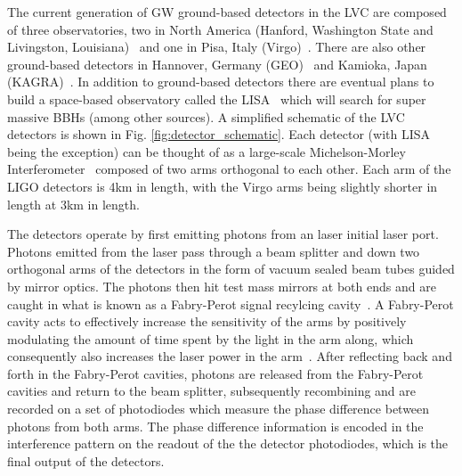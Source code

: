 The current generation of \ac{GW} ground-based detectors in 
the \ac{LVC} are composed of 
three observatories, two in North America 
(Hanford, Washington State and Livingston, Louisiana)~\cite{2015} and 
one in Pisa, Italy (Virgo)~\cite{Acernese_2014}. 
There are also other ground-based detectors 
in Hannover, Germany (GEO)~\cite{Affeldt_2014} and Kamioka, Japan 
(KAGRA)~\cite{Akutsu2019}. 
In addition to ground-based detectors there are eventual plans 
to build a space-based observatory called the \ac{LISA}~\cite{1201.3621} which 
will search for super massive \ac{BBH}s (among other 
sources). A 
simplified schematic of the \ac{LVC} detectors is shown in Fig. \ref{fig:detector_schematic}. Each detector (with \ac{LISA} being the 
exception) can be thought 
of as a large-scale Michelson-Morley Interferometer~\cite{Michelson333} 
composed of two arms orthogonal to each other. Each arm of 
the \ac{LIGO} detectors is 4km in length, with the Virgo arms being 
slightly shorter in length at 3km in length.

The detectors operate by first emitting photons from an laser initial 
laser port. 
Photons emitted from the laser pass through a beam 
splitter and down two orthogonal arms of the detectors in 
the form of vacuum sealed beam tubes guided by mirror optics. The photons 
then hit test mass mirrors at both ends
and are caught in what is known as a Fabry-Perot signal recylcing 
cavity~\cite{1899ApJ.....9...87P}. A Fabry-Perot cavity acts to effectively increase the sensitivity of the arms by positively modulating the 
amount of time spent by the light in the arm along, which consequently 
also increases the laser power in the arm~\cite{PhysRevD.75.102002}. After reflecting back and forth in the 
Fabry-Perot cavities, photons are released 
from the Fabry-Perot cavities and return to the beam splitter, subsequently 
recombining and are recorded on a set of photodiodes which measure 
the phase difference between photons from both 
arms. The phase difference information is 
encoded in the interference pattern on 
the readout of the the detector photodiodes, which is the final output of the detectors.

